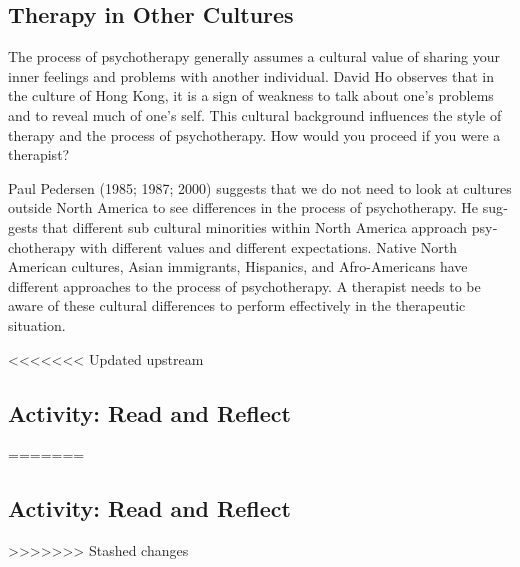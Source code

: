 \documentclass[
]{book}
\begin{document}
\hypertarget{therapy-in-other-cultures-1}{%
\subsection*{Therapy in Other Cultures}\label{therapy-in-other-cultures-1}}

The process of psychotherapy generally assumes a cultural value of sharing your inner feelings and problems with another individual. David Ho observes that in the culture of Hong Kong, it is a sign of weakness to talk about one's problems and to reveal much of one's self. This cultural background influences the style of therapy and the process of psychotherapy. How would you proceed if you were a therapist?

Paul Pedersen (1985; 1987; 2000) suggests that we do not need to look at cultures outside North America to see differences in the process of psychotherapy. He sug­gests that different sub cultural minorities within North America approach psy­chotherapy with different values and different expectations. Native North American cultures, Asian immigrants, Hispanics, and Afro-Americans have different approaches to the pro­cess of psychotherapy. A therapist needs to be aware of these cultural differ­ences to perform effectively in the therapeutic situation.

<<<<<<< Updated upstream
\hypertarget{activity-read-and-reflect-23}{%
\subsection*{Activity: Read and Reflect}\label{activity-read-and-reflect-23}}
=======
\hypertarget{activity-read-and-reflect-22}{%
\subsection*{Activity: Read and Reflect}\label{activity-read-and-reflect-22}}
>>>>>>> Stashed changes
\end{document}
